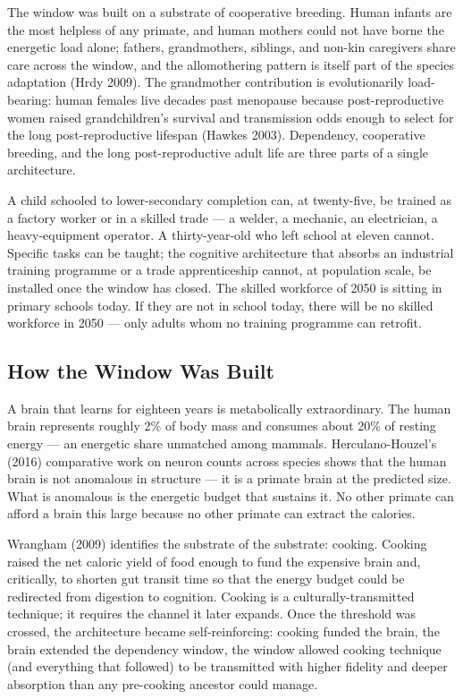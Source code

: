 \documentclass[12pt,letterpaper]{article}
\begin{document}
The window was built on a substrate of cooperative breeding. Human
infants are the most helpless of any primate, and human mothers could
not have borne the energetic load alone; fathers, grandmothers,
siblings, and non-kin caregivers share care across the window, and
the allomothering pattern is itself part of the species adaptation
(Hrdy 2009). The grandmother contribution is evolutionarily
load-bearing: human females live decades past menopause because
post-reproductive women raised grandchildren's survival and
transmission odds enough to select for the long post-reproductive
lifespan (Hawkes 2003). Dependency, cooperative breeding, and
the long post-reproductive adult life are three parts of a single
architecture.

A child schooled to lower-secondary completion can, at twenty-five,
be trained as a factory worker or in a skilled trade --- a welder,
a mechanic, an electrician, a heavy-equipment operator. A
thirty-year-old who left school at eleven cannot. Specific tasks
can be taught; the cognitive architecture that absorbs an
industrial training programme or a trade apprenticeship cannot,
at population scale, be installed once the window has closed. The
skilled workforce of 2050 is sitting in primary schools today.
If they are not in school today, there will be no skilled
workforce in 2050 --- only adults whom no training programme can
retrofit.

\subsection{How the Window Was Built}\label{how-the-window-was-built}

A brain that learns for eighteen years is metabolically extraordinary.
The human brain represents roughly 2\% of body mass and consumes
about 20\% of resting energy --- an energetic share unmatched among
mammals. Herculano-Houzel's (2016) comparative work on neuron counts
across species shows that the human brain is not anomalous in
structure --- it is a primate brain at the predicted size. What is
anomalous is the energetic budget that sustains it. No other primate
can afford a brain this large because no other primate can extract
the calories.

Wrangham (2009) identifies the substrate of the substrate: cooking.
Cooking raised the net caloric yield of food enough to fund the
expensive brain and, critically, to shorten gut transit time so that
the energy budget could be redirected from digestion to cognition.
Cooking is a culturally-transmitted technique; it requires the
channel it later expands. Once the threshold was crossed, the
architecture became self-reinforcing: cooking funded the brain, the
brain extended the dependency window, the window allowed cooking
technique (and everything that followed) to be transmitted with
higher fidelity and deeper absorption than any pre-cooking ancestor
could manage.
\end{document}
